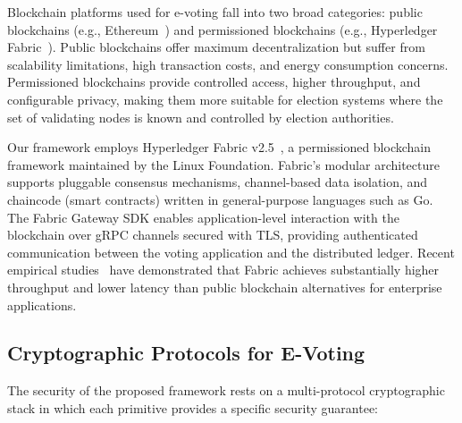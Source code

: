 Blockchain platforms used for e-voting fall into two broad categories: public blockchains (e.g., Ethereum~\cite{wood2014ethereum}) and permissioned blockchains (e.g., Hyperledger Fabric~\cite{androulaki2018}). Public blockchains offer maximum decentralization but suffer from scalability limitations, high transaction costs, and energy consumption concerns. Permissioned blockchains provide controlled access, higher throughput, and configurable privacy, making them more suitable for election systems where the set of validating nodes is known and controlled by election authorities.

Our framework employs Hyperledger Fabric v2.5~\cite{androulaki2018}, a permissioned blockchain framework maintained by the Linux Foundation. Fabric's modular architecture supports pluggable consensus mechanisms, channel-based data isolation, and chaincode (smart contracts) written in general-purpose languages such as Go. The Fabric Gateway SDK enables application-level interaction with the blockchain over gRPC channels secured with TLS, providing authenticated communication between the voting application and the distributed ledger. Recent empirical studies~\cite{fabric_perf} have demonstrated that Fabric achieves substantially higher throughput and lower latency than public blockchain alternatives for enterprise applications.

\subsection{Cryptographic Protocols for E-Voting}
\label{subsec:crypto-protocols}

The security of the proposed framework rests on a multi-protocol cryptographic stack in which each primitive provides a specific security guarantee:

